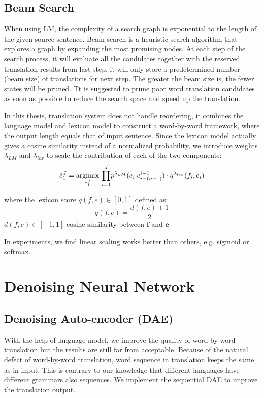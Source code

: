 	\subsection{Beam Search}
	When using LM, the complexity of a search graph is exponential to the length of the given source sentence. Beam search is a heuristic search algorithm that explores a graph by expanding the most promising nodes. At each step of the search process, it will evaluate all the candidates together with the reserved translation results from last step, it will only store a predetermined number (beam size) of translations for next step. The greater the beam size is, the fewer states will be pruned. 	
	Tt is suggested to prune poor word translation candidates as soon as possible to reduce the search space and speed up the translation. 
	
	In this thesis, translation system does not handle reordering, it combines the language model and lexicon model to construct a word-by-word framework, where the output length equals that of input sentence. Since the lexicon model actually gives a cosine similarity instead of a normalized probability, we introduce weights $\lambda_{LM}$ and $\lambda_{lex}$ to scale the contribution of each of the two components:
	\[ \hat{e}_1^J = \underset{e_1^J}{\operatorname{argmax}}{\ \prod_{i=1}^{J}} {p^{\lambda_{LM}}(e_i|e_{i-(n-1)}^{i-1}) \cdot q^{\lambda_{lex}}(f_i,e_i)}\]

 	where the lexicon score ${q(f,e) \in [0,1]}$ defined as:
 	\[q(f,e) = \frac{d(f,e)+1}{2} \]
 	${d(f,e)\in [-1,1]}$ cosine similarity between $\bm{f}$ and $\bm{e}$
	
	
	In experiments, we find linear scaling works better than others, e.g. sigmoid or softmax.
	
\section{Denoising Neural Network}
\subsection{Denoising Auto-encoder (DAE)}
	With the help of language model, we improve the quality of word-by-word translation but the results are still far from acceptable. Because of the natural defect of word-by-word translation, word sequence in translation keeps the same as in input. This is contrary to our knowledge that different languages have different grammars also sequences. We implement the sequential DAE to improve the translation output.
	
